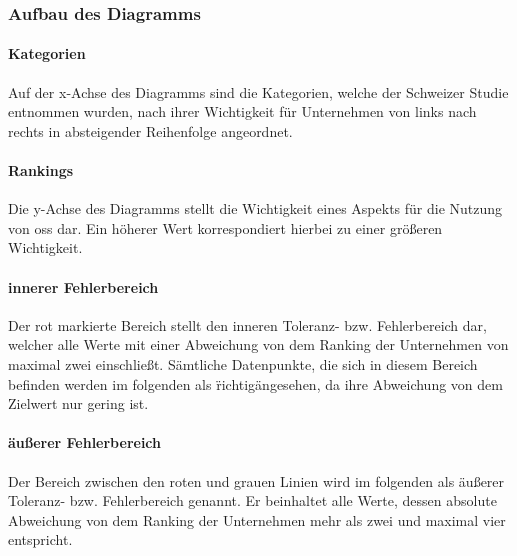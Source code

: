 \documentclass[a4paper]{article}
\begin{document}
            \subsubsection{Aufbau des Diagramms}
                \paragraph{Kategorien}
                    Auf der x-Achse des Diagramms sind die Kategorien, welche der Schweizer Studie entnommen wurden, nach ihrer Wichtigkeit für Unternehmen von links nach rechts in absteigender Reihenfolge angeordnet.
                    
                \paragraph{Rankings}
                    Die y-Achse des Diagramms stellt die Wichtigkeit eines Aspekts für die Nutzung von \gls{oss} dar. Ein höherer Wert korrespondiert hierbei zu einer größeren Wichtigkeit.
                    
                \paragraph{innerer Fehlerbereich}
                    Der rot markierte Bereich stellt den inneren Toleranz- bzw. Fehlerbereich dar, welcher alle Werte mit einer Abweichung von dem Ranking der Unternehmen von maximal zwei einschließt. Sämtliche Datenpunkte, die sich in diesem Bereich befinden werden im folgenden als \"richtig\" angesehen, da ihre Abweichung von dem Zielwert nur gering ist.
                    
                \paragraph{äußerer Fehlerbereich}
                    Der Bereich zwischen den roten und grauen Linien wird im folgenden als äußerer Toleranz- bzw. Fehlerbereich genannt. Er beinhaltet alle Werte, dessen absolute Abweichung von dem Ranking der Unternehmen mehr als zwei und maximal vier entspricht.
                    
\end{document}
